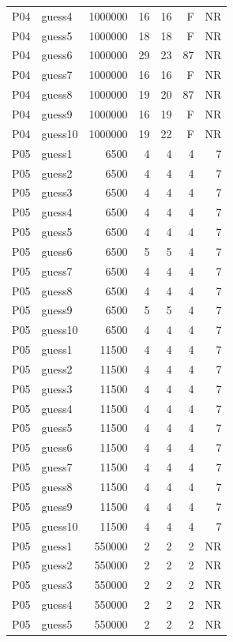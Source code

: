 {\begin{longtable}{llrrrrr}
P04 & guess4 & 1000000 & 16 & 16 & F & NR \\
P04 & guess5 & 1000000 & 18 & 18 & F & NR \\
P04 & guess6 & 1000000 & 29 & 23 & 87 & NR \\
P04 & guess7 & 1000000 & 16 & 16 & F & NR \\
P04 & guess8 & 1000000 & 19 & 20 & 87 & NR \\
P04 & guess9 & 1000000 & 16 & 19 & F & NR \\
P04 & guess10 & 1000000 & 19 & 22 & F & NR \\
P05 & guess1 & 6500 & 4 & 4 & 4 & 7 \\
P05 & guess2 & 6500 & 4 & 4 & 4 & 7 \\
P05 & guess3 & 6500 & 4 & 4 & 4 & 7 \\
P05 & guess4 & 6500 & 4 & 4 & 4 & 7 \\
P05 & guess5 & 6500 & 4 & 4 & 4 & 7 \\
P05 & guess6 & 6500 & 5 & 5 & 4 & 7 \\
P05 & guess7 & 6500 & 4 & 4 & 4 & 7 \\
P05 & guess8 & 6500 & 4 & 4 & 4 & 7 \\
P05 & guess9 & 6500 & 5 & 5 & 4 & 7 \\
P05 & guess10 & 6500 & 4 & 4 & 4 & 7 \\
P05 & guess1 & 11500 & 4 & 4 & 4 & 7 \\
P05 & guess2 & 11500 & 4 & 4 & 4 & 7 \\
P05 & guess3 & 11500 & 4 & 4 & 4 & 7 \\
P05 & guess4 & 11500 & 4 & 4 & 4 & 7 \\
P05 & guess5 & 11500 & 4 & 4 & 4 & 7 \\
P05 & guess6 & 11500 & 4 & 4 & 4 & 7 \\
P05 & guess7 & 11500 & 4 & 4 & 4 & 7 \\
P05 & guess8 & 11500 & 4 & 4 & 4 & 7 \\
P05 & guess9 & 11500 & 4 & 4 & 4 & 7 \\
P05 & guess10 & 11500 & 4 & 4 & 4 & 7 \\
P05 & guess1 & 550000 & 2 & 2 & 2 & NR \\
P05 & guess2 & 550000 & 2 & 2 & 2 & NR \\
P05 & guess3 & 550000 & 2 & 2 & 2 & NR \\
P05 & guess4 & 550000 & 2 & 2 & 2 & NR \\
P05 & guess5 & 550000 & 2 & 2 & 2 & NR \\

\end{longtable}}
